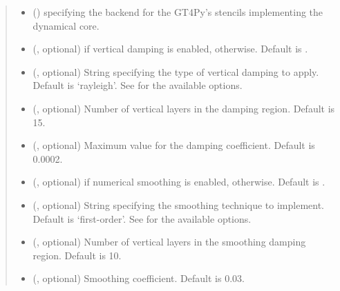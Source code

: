 \documentclass[letterpaper,10pt,english]{sphinxmanual}
\begin{document}
\begin{fulllineitems}
\begin{fulllineitems}
\begin{quote}
\begin{description}
\begin{itemize}
\item {} 
 () \textendash{}  specifying the backend for the GT4Py’s stencils implementing the dynamical core.

\item {} 
 (, optional) \textendash{}  if vertical damping is enabled,  otherwise. Default is .

\item {} 
 (, optional) \textendash{} String specifying the type of vertical damping to apply. Default is ‘rayleigh’.
See {\hyperref[\detokenize{api:dycore.vertical_damping.VerticalDamping}]{}} for the available options.

\item {} 
 (, optional) \textendash{} Number of vertical layers in the damping region. Default is 15.

\item {} 
 (, optional) \textendash{} Maximum value for the damping coefficient. Default is 0.0002.

\item {} 
 (, optional) \textendash{}  if numerical smoothing is enabled,  otherwise. Default is .

\item {} 
 (, optional) \textendash{} String specifying the smoothing technique to implement. Default is ‘first-order’.
See {\hyperref[\detokenize{api:dycore.horizontal_smoothing.HorizontalSmoothing}]{}} for the available options.

\item {} 
 (, optional) \textendash{} Number of vertical layers in the smoothing damping region. Default is 10.

\item {} 
 (, optional) \textendash{} Smoothing coefficient. Default is 0.03.


\end{itemize}
\end{description}
\end{quote}
\end{fulllineitems}
\end{fulllineitems}
\end{document}
